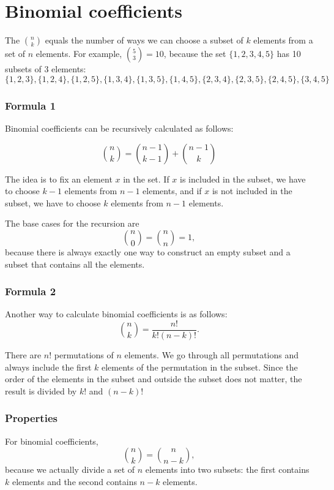 \section{Binomial coefficients}


The  ${n \choose k}$
equals the number of ways we can choose a subset
of $k$ elements from a set of $n$ elements.
For example, ${5 \choose 3}=10$,
because the set $\{1,2,3,4,5\}$
has 10 subsets of 3 elements:
\[ \{1,2,3\}, \{1,2,4\}, \{1,2,5\}, \{1,3,4\}, \{1,3,5\}, 
\{1,4,5\}, \{2,3,4\}, \{2,3,5\}, \{2,4,5\}, \{3,4,5\} \]

\subsubsection{Formula 1}

Binomial coefficients can be
recursively calculated as follows:

\[
{n \choose k}  =  {n-1 \choose k-1} + {n-1 \choose k}
\]

The idea is to fix an element $x$ in the set.
If $x$ is included in the subset,
we have to choose $k-1$
elements from $n-1$ elements,
and if $x$ is not included in the subset,
we have to choose $k$ elements from $n-1$ elements.

The base cases for the recursion are
\[
{n \choose 0}  =  {n \choose n} = 1,
\]
because there is always exactly
one way to construct an empty subset
and a subset that contains all the elements.

\subsubsection{Formula 2}

Another way to calculate binomial coefficients is as follows:
\[
{n \choose k}  =  \frac{n!}{k!(n-k)!}.
\]

There are $n!$ permutations of $n$ elements.
We go through all permutations and always
include the first $k$ elements of the permutation
in the subset.
Since the order of the elements in the subset
and outside the subset does not matter,
the result is divided by $k!$ and $(n-k)!$

\subsubsection{Properties}

For binomial coefficients,
\[
{n \choose k}  =  {n \choose n-k},
\]
because we actually divide a set of $n$ elements into
two subsets: the first contains $k$ elements
and the second contains $n-k$ elements.

